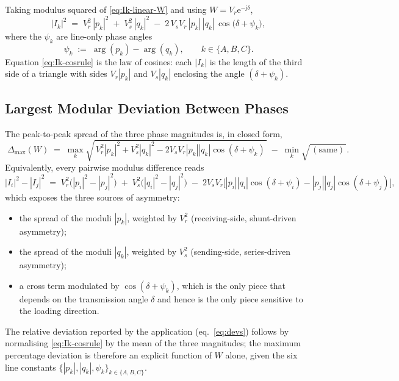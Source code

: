 \documentclass[11pt,a4paper]{article}
\newcommand{\jj}{\mathrm{j}}
\newcommand{\ee}{\mathrm{e}}
\begin{document}
Taking modulus squared of \eqref{eq:Ik-linear-W} and using
\(W=V_{r}\ee^{-\jj\delta}\),
\begin{equation}
|I_{k}|^{2}
\;=\; V_{r}^{2}\,|p_{k}|^{2}
\;+\; V_{s}^{2}\,|q_{k}|^{2}
\;-\; 2\,V_{s} V_{r}\,|p_{k}|\,|q_{k}|\,\cos\!\bigl(\delta + \psi_{k}\bigr),
\label{eq:Ik-cosrule}
\end{equation}
where the \(\psi_{k}\) are line-only phase angles
\begin{equation}
\psi_{k} \;:=\; \arg(p_{k}) - \arg(q_{k}),\qquad k\in\{A,B,C\}.
\label{eq:psi-def}
\end{equation}
Equation \eqref{eq:Ik-cosrule} is the law of cosines: each \(|I_{k}|\) is the
length of the third side of a triangle with sides \(V_{r}|p_{k}|\) and
\(V_{s}|q_{k}|\) enclosing the angle \((\delta+\psi_{k})\).

\subsection{Largest Modular Deviation Between Phases}

The peak-to-peak spread of the three phase magnitudes is, in closed form,
\begin{equation}
\boxed{\;
\Delta_{\max}(W) \;=\;
\max_{k}\!\sqrt{\,V_{r}^{2}|p_{k}|^{2}+V_{s}^{2}|q_{k}|^{2}-2V_{s}V_{r}|p_{k}||q_{k}|\cos(\delta+\psi_{k})\,}
\;-\;\min_{k}\!\sqrt{\,(\text{same})\,}.\;}
\label{eq:Deltamax}
\end{equation}
Equivalently, every pairwise modulus difference reads
\begin{equation}
|I_{i}|^{2}-|I_{j}|^{2}
\;=\;V_{r}^{2}\bigl(|p_{i}|^{2}-|p_{j}|^{2}\bigr)
\;+\;V_{s}^{2}\bigl(|q_{i}|^{2}-|q_{j}|^{2}\bigr)
\;-\;2V_{s}V_{r}\bigl[|p_{i}||q_{i}|\cos(\delta+\psi_{i})-|p_{j}||q_{j}|\cos(\delta+\psi_{j})\bigr],
\label{eq:pairwise-diff}
\end{equation}
which exposes the three sources of asymmetry:
\begin{itemize}
\item the spread of the moduli \(|p_{k}|\), weighted by \(V_{r}^{2}\)
(receiving-side, shunt-driven asymmetry);
\item the spread of the moduli \(|q_{k}|\), weighted by \(V_{s}^{2}\)
(sending-side, series-driven asymmetry);
\item a cross term modulated by \(\cos(\delta+\psi_{k})\), which is the only
piece that depends on the transmission angle \(\delta\) and hence is the
only piece sensitive to the loading direction.
\end{itemize}
The relative deviation reported by the application
(eq.~\ref{eq:devs}) follows by normalising \eqref{eq:Ik-cosrule} by the mean
of the three magnitudes; the maximum percentage deviation is therefore an
explicit function of \(W\) alone, given the six line constants
\(\{|p_{k}|,|q_{k}|,\psi_{k}\}_{k\in\{A,B,C\}}\).
\end{document}
